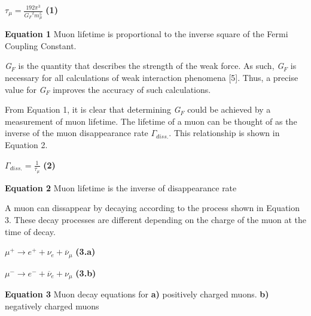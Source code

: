 \documentclass{article}
\begin{document}
\begin{center}
    
    $\tau_{\mu} = \frac{192 \pi^3}{\textit{G$_{F}$}^2 m_{\mu}^5}$ \hspace{10mm} \textbf{(1)}
    
    \vspace{5mm}
    
    \textbf{Equation 1} Muon lifetime is proportional to the inverse square of the Fermi Coupling Constant.
    
\end{center}


\textit{G$_{F}$} is the quantity that describes the strength of the weak force. As such, \textit{G$_{F}$} is necessary for all calculations of weak interaction phenomena [5]. %
Thus, a precise value for \textit{G$_{F}$} improves the accuracy of such calculations.


From Equation 1, it is clear that determining \textit{G$_{F}$} could be achieved by a measurement of muon lifetime. The lifetime of a muon can be thought of as the inverse of the muon disappearance rate $\Gamma_{diss.}$. This relationship is shown in Equation 2. 

\begin{center}

    $\Gamma_{diss.} = \frac{1}{\tau_{\mu}}$ \hspace{10mm} \textbf{(2)}
    
    \vspace{5mm}
    
    \textbf{Equation 2} Muon lifetime is the inverse of disappearance rate
    
\end{center}

A muon can dissappear by decaying according to the process shown in Equation 3. These decay processes are different depending on the charge of the muon at the time of decay. 

\begin{center}
    
    $\mu^{+} \rightarrow e^{+} + \nu_{e} + \overline{\nu}_{\mu}$ \hspace{10mm} \textbf{(3.a)}
    
    \vspace{1 mm}
    
    $\mu^{-} \rightarrow e^{-} + \overline{\nu}_{e} + \nu_{\mu}$ \hspace{10mm} \textbf{(3.b)}
    
    \vspace{5mm}
    
    \textbf{Equation 3} Muon decay equations for \textbf{a)} positively charged muons. \textbf{b)} negatively charged muons 
    
\end{center}
  
\end{document}
